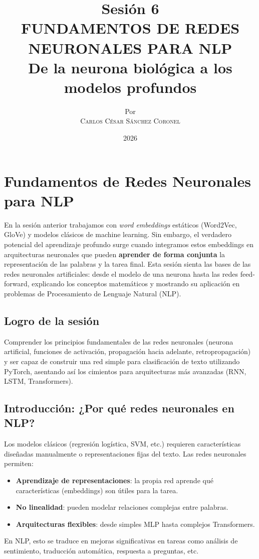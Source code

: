 \documentclass[12pt,a4paper,openany,oneside]{book}
\title{
    \textbf{Sesión 6} \\ 
    \Huge \textbf{FUNDAMENTOS DE REDES NEURONALES PARA NLP} \\
    \Large De la neurona biológica a los modelos profundos
}
\author{
    \small Por \\ \vspace{0.2cm}
    \Large \textsc{Carlos César Sánchez Coronel}
}
\date{2026}
\begin{document}
\maketitle
\tableofcontents
{}

\chapter{Fundamentos de Redes Neuronales para NLP}

En la sesión anterior trabajamos con \textit{word embeddings} estáticos (Word2Vec, GloVe) y modelos clásicos de machine learning. Sin embargo, el verdadero potencial del aprendizaje profundo surge cuando integramos estos embeddings en arquitecturas neuronales que pueden \textbf{aprender de forma conjunta} la representación de las palabras y la tarea final. Esta sesión sienta las bases de las redes neuronales artificiales: desde el modelo de una neurona hasta las redes feed-forward, explicando los conceptos matemáticos y mostrando su aplicación en problemas de Procesamiento de Lenguaje Natural (NLP).

\section{Logro de la sesión}
Comprender los principios fundamentales de las redes neuronales (neurona artificial, funciones de activación, propagación hacia adelante, retropropagación) y ser capaz de construir una red simple para clasificación de texto utilizando PyTorch, asentando así los cimientos para arquitecturas más avanzadas (RNN, LSTM, Transformers).

\section{Introducción: ¿Por qué redes neuronales en NLP?}
Los modelos clásicos (regresión logística, SVM, etc.) requieren características diseñadas manualmente o representaciones fijas del texto. Las redes neuronales permiten:
\begin{itemize}
    \item \textbf{Aprendizaje de representaciones}: la propia red aprende qué características (embeddings) son útiles para la tarea.
    \item \textbf{No linealidad}: pueden modelar relaciones complejas entre palabras.
    \item \textbf{Arquitecturas flexibles}: desde simples MLP hasta complejos Transformers.
\end{itemize}
En NLP, esto se traduce en mejoras significativas en tareas como análisis de sentimiento, traducción automática, respuesta a preguntas, etc.
\end{document}
